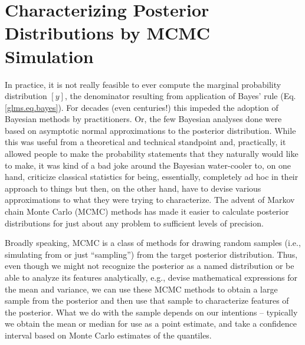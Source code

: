 \section{Characterizing Posterior Distributions by MCMC Simulation}

In practice, it is not really feasible to ever compute the marginal
probability distribution $[y]$, the denominator resulting from
application of Bayes' rule
(Eq. \ref{glms.eq.bayes}). For decades (even centuries!) this impeded the adoption of
Bayesian methods by practitioners. Or, the few Bayesian analyses done
were based on asymptotic normal approximations to the posterior
distribution. While this was useful from a theoretical and
technical standpoint and, practically, it allowed people to make the
probability statements that they naturally would like to make, it was
kind of a bad joke around the Bayesian water-cooler to, on one hand,
criticize classical statistics for being, essentially, completely ad
hoc in their approach to things but then, on the other hand, have to
devise various approximations to what they were trying to
characterize. The advent of Markov chain Monte Carlo (MCMC) methods
has made it easier to calculate posterior distributions for just about
any problem to sufficient levels of precision.

Broadly speaking, MCMC is a class of methods for drawing random
samples
(i.e., simulating from or just ``sampling'') from the target posterior
distribution.  Thus, even though we might not recognize the posterior
as a named distribution or be able to analyze its features
analytically, e.g., devise mathematical expressions for the mean and
variance, we can use these MCMC methods to obtain a large sample from
the posterior and then use that sample to characterize features of the
posterior. What we do with the sample depends on our intentions --
typically we obtain the mean or median for use as a point estimate,
and take a confidence interval based on Monte Carlo estimates of the
quantiles. 

